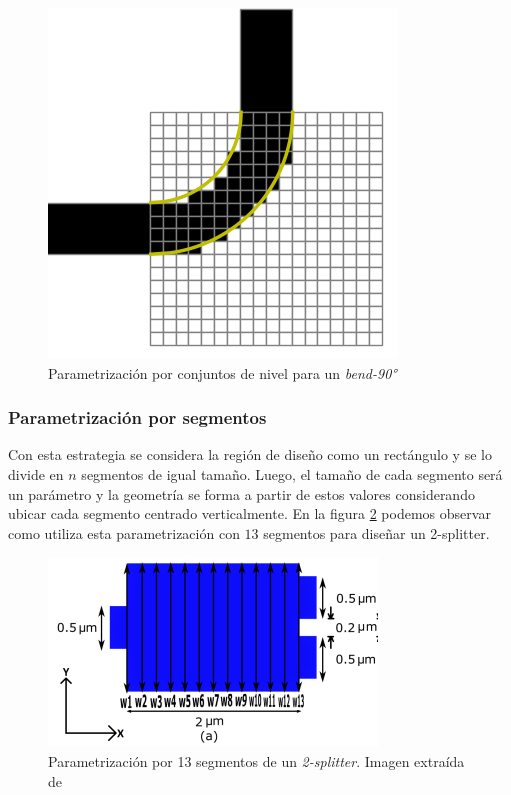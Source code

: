 \begin{figure}[h]
  \centering
  \includegraphics[scale=0.8]{image/theory/parametrization-levelsets.png}
  \caption{Parametrización por conjuntos de nivel para un \emph{bend-90°}}
  \label{fig:levelsets}
\end{figure}




\subsubsection{Parametrización por segmentos}

Con esta estrategia se considera la región de diseño como un rectángulo y se lo divide en $n$ segmentos de igual tamaño. 
Luego, el tamaño de cada segmento será un parámetro y la geometría se forma a partir de estos valores considerando ubicar cada segmento centrado verticalmente. 
En la figura \ref{fig:splines} podemos observar como \cite{Prosopio-Galarza2019} utiliza esta parametrización con $13$ segmentos para diseñar un 2-splitter.


\begin{figure}[ht]
  \centering
  \includegraphics[scale=0.8]{image/theory/parametrization-spline.png}
  \caption{Parametrización por 13 segmentos de un \emph{2-splitter}. Imagen extraída de \cite{Prosopio-Galarza2019}}
  \label{fig:splines}
\end{figure}


